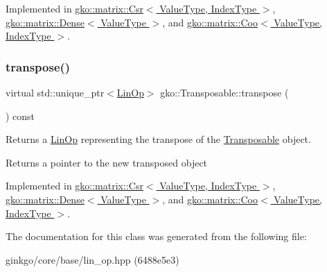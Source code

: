Implemented in \hyperlink{classgko_1_1matrix_1_1Csr_a38820451af5424f18b767667f3067d72}{gko\+::matrix\+::\+Csr$<$ Value\+Type, Index\+Type $>$}, \hyperlink{classgko_1_1matrix_1_1Dense_a19890b1448497a50d57c16ed4c3bd820}{gko\+::matrix\+::\+Dense$<$ Value\+Type $>$}, and \hyperlink{classgko_1_1matrix_1_1Coo_ac1d91c524ca616b4c9e5f2a62f3f55ce}{gko\+::matrix\+::\+Coo$<$ Value\+Type, Index\+Type $>$}.

\mbox{\label{classgko_1_1Transposable_a5c6b778b71b47d53e0bda6ccf894d318}} 
\subsubsection{\texorpdfstring{transpose()}{transpose()}}
{\footnotesize\ttfamily virtual std\+::unique\+\_\+ptr$<$\hyperlink{classgko_1_1LinOp}{Lin\+Op}$>$ gko\+::\+Transposable\+::transpose (\begin{DoxyParamCaption}{ }\end{DoxyParamCaption}) const\hspace{0.3cm}{\ttfamily [pure virtual]}}



Returns a \hyperlink{classgko_1_1LinOp}{Lin\+Op} representing the transpose of the \hyperlink{classgko_1_1Transposable}{Transposable} object. 

\begin{DoxyReturn}{Returns}
a pointer to the new transposed object 
\end{DoxyReturn}


Implemented in \hyperlink{classgko_1_1matrix_1_1Csr_ab79e609214d6b4834d5961ee0a7d3519}{gko\+::matrix\+::\+Csr$<$ Value\+Type, Index\+Type $>$}, \hyperlink{classgko_1_1matrix_1_1Dense_a64ea8e876f5390a535a2ef486bd5ab9a}{gko\+::matrix\+::\+Dense$<$ Value\+Type $>$}, and \hyperlink{classgko_1_1matrix_1_1Coo_ae6533c08c7f818d3bdd80b2871784dab}{gko\+::matrix\+::\+Coo$<$ Value\+Type, Index\+Type $>$}.



The documentation for this class was generated from the following file\+:\begin{DoxyCompactItemize}
\item 
ginkgo/core/base/lin\+\_\+op.\+hpp (6488e5e3)\end{DoxyCompactItemize}
